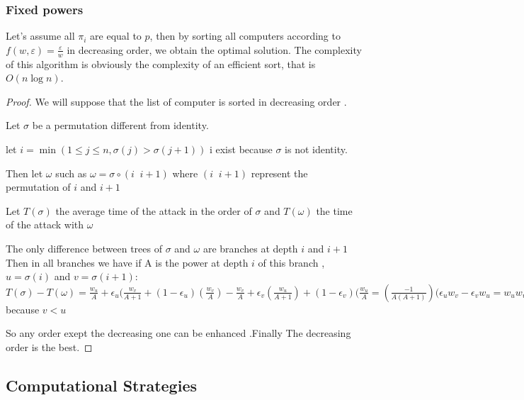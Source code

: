 \documentclass[11pt]{llncs}
\begin{document}
	\subsubsection{Fixed powers}
		Let's assume all $\pi_i$ are equal to $p$, then by sorting all computers according to $f(w,\varepsilon)=\frac{\varepsilon}{w}$ in decreasing order, we obtain the optimal solution. The complexity of this algorithm is obviously the complexity of an efficient sort, that is $O(n\log n)$.
		\begin{proof}
We will suppose that the list of computer is sorted in decreasing order .

Let $\sigma$ be a permutation different from identity.

let $i= \min(1 \leq j \leq n , \sigma (j) > \sigma (j+1))$ i exist because $\sigma$ is not identity.

Then let $\omega$ such as $\omega = \sigma \circ (i \;\; i+1)$ where $(i \;\; i+1)$ represent the permutation of $i$ and $i+1$

Let $T(\sigma)$ the average time of the attack in the order of $\sigma$ and $T(\omega)$ the time of the attack with $\omega$

The only difference between trees of $\sigma$ and $\omega$ are branches at depth $i$ and $i+1$
Then in all branches we have if A is the power at depth $i$ of this branch  ,$u= \sigma (i)$ and $v= \sigma (i+1)$:
$ T(\sigma) - T(\omega)=\frac{w_u}{A} +\epsilon_u( \frac{w_v}{A+1} +(1- \epsilon_u)(\frac{w_v}{A})- 
\frac{w_v}{A} +\epsilon_v( \frac{w_u}{A+1}) +(1- \epsilon_v)(\frac{w_u}{A} = (\frac{-1}{A(A+1)})(\epsilon_u w_v-\epsilon_v w_u
=w_uw_v(\frac{1}{A(A+1)})(\frac{\epsilon_{v}}{w_v}-\frac{\epsilon_u}{w_u})\geq 0$
because $v < u$

So any order exept the decreasing one can be enhanced .Finally The decreasing order is the best.

		\end{proof}
\subsection{Computational Strategies}
\end{document}
